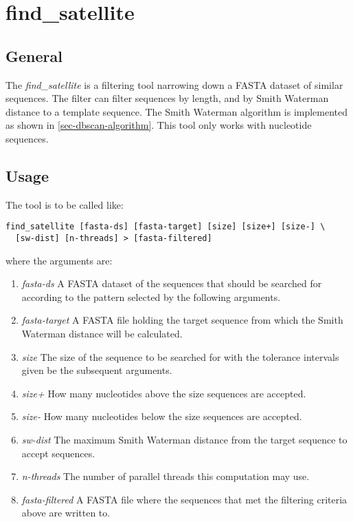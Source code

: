 \section{find\_satellite}

\subsection{General}

The \emph{find\_satellite} is a filtering tool narrowing down a FASTA
dataset of similar sequences. The filter can filter sequences by
length, and by Smith Waterman distance to a template sequence. The
Smith Waterman algorithm is implemented as shown in
\ref{sec-dbscan-algorithm}. This tool only works with nucleotide
sequences. 

\subsection{Usage}
The tool is to be called like:
\begin{lstlisting}
find_satellite [fasta-ds] [fasta-target] [size] [size+] [size-] \
  [sw-dist] [n-threads] > [fasta-filtered]
\end{lstlisting}
where the arguments are:
\begin{enumerate}
  \item \emph{fasta-ds} A FASTA dataset of the sequences that should be searched
    for according to the pattern selected by the following arguments.
  \item \emph{fasta-target} A FASTA file holding the target sequence
    from which the Smith Waterman distance will be calculated.
  \item \emph{size} The size of the sequence to be searched for with
    the tolerance intervals given be the subsequent arguments.
  \item \emph{size+} How many nucleotides above the size sequences are
    accepted.
  \item \emph{size-} How many nucleotides below the size sequences are
    accepted.
  \item \emph{sw-dist} The maximum Smith Waterman distance from the
    target sequence to accept sequences.
  \item \emph{n-threads} The number of parallel threads this
    computation may use.
  \item \emph{fasta-filtered} A FASTA file where the sequences that
    met the filtering criteria above are written to. 
\end{enumerate}

